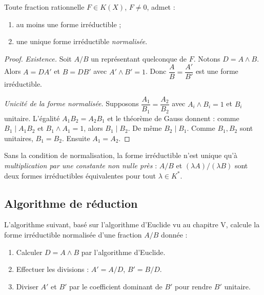 \begin{theoreme}
Toute fraction rationnelle $F \in K(X)$, $F \neq 0$, admet :
\begin{enumerate}
    \item au moins une forme irréductible ;
    \item une unique forme irréductible \emph{normalisée}.
\end{enumerate}
\end{theoreme}

\begin{proof}
\emph{Existence.} Soit $A/B$ un représentant quelconque de $F$. Notons $D = A \wedge B$. Alors $A = D A'$ et $B = D B'$ avec $A' \wedge B' = 1$. Donc $\dfrac{A}{B} = \dfrac{A'}{B'}$ est une forme irréductible.

\emph{Unicité de la forme normalisée.} Supposons $\dfrac{A_1}{B_1} = \dfrac{A_2}{B_2}$ avec $A_i \wedge B_i = 1$ et $B_i$ unitaire. L'égalité $A_1 B_2 = A_2 B_1$ et le théorème de Gauss donnent : comme $B_1 \mid A_1 B_2$ et $B_1 \wedge A_1 = 1$, alors $B_1 \mid B_2$. De même $B_2 \mid B_1$. Comme $B_1, B_2$ sont unitaires, $B_1 = B_2$. Ensuite $A_1 = A_2$.
\end{proof}

\begin{remarque}
Sans la condition de normalisation, la forme irréductible n'est unique qu'à \emph{multiplication par une constante non nulle près} : $A/B$ et $(\lambda A)/(\lambda B)$ sont deux formes irréductibles équivalentes pour tout $\lambda \in K^*$.
\end{remarque}

\subsection{Algorithme de réduction}

L'algorithme suivant, basé sur l'algorithme d'Euclide vu au chapitre V, calcule la forme irréductible normalisée d'une fraction $A/B$ donnée :

\begin{enumerate}
    \item Calculer $D = A \wedge B$ par l'algorithme d'Euclide.
    \item Effectuer les divisions : $A' = A / D$, $B' = B / D$.
    \item Diviser $A'$ et $B'$ par le coefficient dominant de $B'$ pour rendre $B'$ unitaire.
\end{enumerate}

